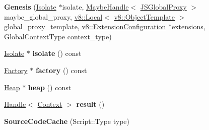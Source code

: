 \begin{DoxyCompactItemize}
\item 
{\bfseries Genesis} (\hyperlink{classv8_1_1internal_1_1_isolate}{Isolate} $\ast$isolate, \hyperlink{classv8_1_1internal_1_1_maybe_handle}{Maybe\+Handle}$<$ \hyperlink{classv8_1_1internal_1_1_j_s_global_proxy}{J\+S\+Global\+Proxy} $>$ maybe\+\_\+global\+\_\+proxy, \hyperlink{classv8_1_1_local}{v8\+::\+Local}$<$ \hyperlink{classv8_1_1_object_template}{v8\+::\+Object\+Template} $>$ global\+\_\+proxy\+\_\+template, \hyperlink{classv8_1_1_extension_configuration}{v8\+::\+Extension\+Configuration} $\ast$extensions, Global\+Context\+Type context\+\_\+type)\hypertarget{classv8_1_1internal_1_1_b_a_s_e___e_m_b_e_d_d_e_d_a362653a77473087ff0cefc5c040fae98}{}\label{classv8_1_1internal_1_1_b_a_s_e___e_m_b_e_d_d_e_d_a362653a77473087ff0cefc5c040fae98}

\item 
\hyperlink{classv8_1_1internal_1_1_isolate}{Isolate} $\ast$ {\bfseries isolate} () const \hypertarget{classv8_1_1internal_1_1_b_a_s_e___e_m_b_e_d_d_e_d_a8fd23ecb465f23cd3c60deb9a7bde1f8}{}\label{classv8_1_1internal_1_1_b_a_s_e___e_m_b_e_d_d_e_d_a8fd23ecb465f23cd3c60deb9a7bde1f8}

\item 
\hyperlink{classv8_1_1internal_1_1_factory}{Factory} $\ast$ {\bfseries factory} () const \hypertarget{classv8_1_1internal_1_1_b_a_s_e___e_m_b_e_d_d_e_d_a4804ce35bf86e0493b7e814ceea0fb8f}{}\label{classv8_1_1internal_1_1_b_a_s_e___e_m_b_e_d_d_e_d_a4804ce35bf86e0493b7e814ceea0fb8f}

\item 
\hyperlink{classv8_1_1internal_1_1_heap}{Heap} $\ast$ {\bfseries heap} () const \hypertarget{classv8_1_1internal_1_1_b_a_s_e___e_m_b_e_d_d_e_d_a865b72138f670421743f29092f13ef22}{}\label{classv8_1_1internal_1_1_b_a_s_e___e_m_b_e_d_d_e_d_a865b72138f670421743f29092f13ef22}

\item 
\hyperlink{classv8_1_1internal_1_1_handle}{Handle}$<$ \hyperlink{classv8_1_1internal_1_1_context}{Context} $>$ {\bfseries result} ()\hypertarget{classv8_1_1internal_1_1_b_a_s_e___e_m_b_e_d_d_e_d_af23e14709b72584a062d4fa04f437ff3}{}\label{classv8_1_1internal_1_1_b_a_s_e___e_m_b_e_d_d_e_d_af23e14709b72584a062d4fa04f437ff3}

\item 
{\bfseries Source\+Code\+Cache} (Script\+::\+Type type)\hypertarget{classv8_1_1internal_1_1_b_a_s_e___e_m_b_e_d_d_e_d_a54733cbfab74169453770a02449b7c82}{}\label{classv8_1_1internal_1_1_b_a_s_e___e_m_b_e_d_d_e_d_a54733cbfab74169453770a02449b7c82}


\end{DoxyCompactItemize}
